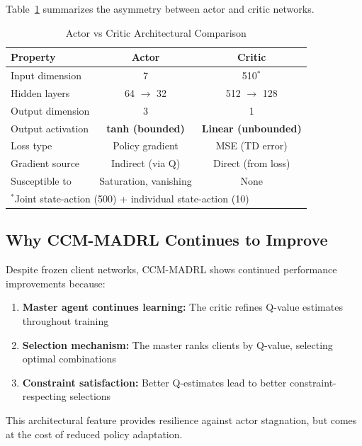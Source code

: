 Table~\ref{tab:architecture} summarizes the asymmetry between actor and critic networks.

\begin{table}[htbp]
\caption{Actor vs Critic Architectural Comparison}
\label{tab:architecture}
\centering
\begin{tabular}{lcc}
\toprule
\textbf{Property} & \textbf{Actor} & \textbf{Critic} \\
\midrule
Input dimension & 7 & 510$^*$ \\
Hidden layers & 64 $\rightarrow$ 32 & 512 $\rightarrow$ 128 \\
Output dimension & 3 & 1 \\
Output activation & \textbf{tanh (bounded)} & \textbf{Linear (unbounded)} \\
Loss type & Policy gradient & MSE (TD error) \\
Gradient source & Indirect (via Q) & Direct (from loss) \\
Susceptible to & Saturation, vanishing & None \\
\bottomrule
\multicolumn{3}{l}{\footnotesize $^*$Joint state-action (500) + individual state-action (10)}
\end{tabular}
\end{table}

\subsection{Why CCM-MADRL Continues to Improve}

Despite frozen client networks, CCM-MADRL shows continued performance improvements because:
\begin{enumerate}
    \item \textbf{Master agent continues learning:} The critic refines Q-value estimates throughout training
    \item \textbf{Selection mechanism:} The master ranks clients by Q-value, selecting optimal combinations
    \item \textbf{Constraint satisfaction:} Better Q-estimates lead to better constraint-respecting selections
\end{enumerate}

This architectural feature provides resilience against actor stagnation, but comes at the cost of reduced policy adaptation.
